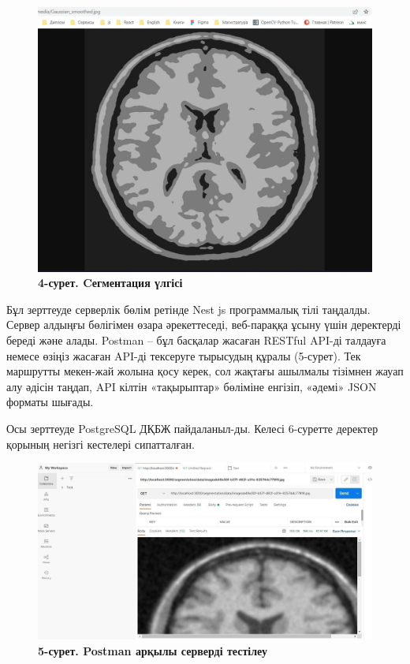 \begin{figure}[H]
\begin{minipage}{0.45\textwidth}
      \includegraphics[width=1\textwidth]{assets/195}
      \caption*{}
  \end{minipage}

  \caption*{\bfseries4-сурет. Cегментация үлгісі}
\end{figure}

\begin{multicols}{2}


Бұл зерттеуде серверлік бөлім ретінде Nest js программалық тілі
таңдалды. Сервер алдыңғы бөлігімен өзара әрекеттеседі, веб-параққа ұсыну
үшін деректерді береді және алады. Postman -- бұл басқалар жасаған
RESTful API-ді талдауға немесе өзіңіз жасаған API-ді тексеруге тырысудың
құралы (5-сурет). Тек маршрутты мекен-жай жолына қосу керек, сол жақтағы
ашылмалы тізімнен жауап алу әдісін таңдап, API кілтін «тақырыптар»
бөліміне енгізіп, «әдемі» JSON форматы шығады.

Осы зерттеуде PostgreSQL ДҚБЖ пайдаланыл-ды. Келесі 6-суретте деректер
қорының негізгі кестелері сипатталған.
\end{multicols}

\begin{figure}[H]
	\centering
	\includegraphics[width=1\textwidth]{assets/196}
	\caption*{\bfseries 5-сурет. Postman арқылы серверді тестілеу}
\end{figure}





